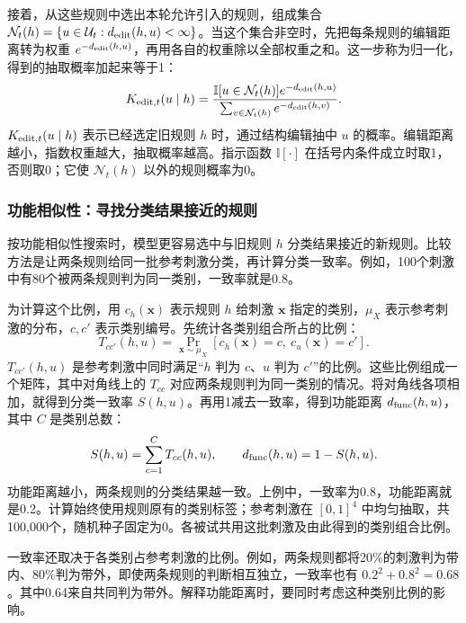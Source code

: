 \documentclass[12pt]{article}
\newcommand{\ind}{\mathbb I}
\begin{document}
接着，从这些规则中选出本轮允许引入的规则，组成集合 $\mathcal N_t(h)=\{u\in\mathcal U_t:d_{\rm edit}(h,u)<\infty\}$。当这个集合非空时，先把每条规则的编辑距离转为权重 $e^{-d_{\rm edit}(h,u)}$，再用各自的权重除以全部权重之和。这一步称为归一化，得到的抽取概率加起来等于1：
\begin{equation}
K_{{\rm edit},t}(u\mid h)=
\frac{\ind[u\in\mathcal N_t(h)]e^{-d_{\rm edit}(h,u)}}
{\sum_{v\in\mathcal N_t(h)}e^{-d_{\rm edit}(h,v)}}.
\label{eq:edit-proposal}
\end{equation}
$K_{{\rm edit},t}(u\mid h)$ 表示已经选定旧规则 $h$ 时，通过结构编辑抽中 $u$ 的概率。编辑距离越小，指数权重越大，抽取概率越高。指示函数 $\ind[\cdot]$ 在括号内条件成立时取1，否则取0；它使 $\mathcal N_t(h)$ 以外的规则概率为0。

\subsubsection{功能相似性：寻找分类结果接近的规则}

按功能相似性搜索时，模型更容易选中与旧规则 $h$ 分类结果接近的新规则。比较方法是让两条规则给同一批参考刺激分类，再计算分类一致率。例如，100个刺激中有80个被两条规则判为同一类别，一致率就是0.8。

为计算这个比例，用 $c_h(\bm x)$ 表示规则 $h$ 给刺激 $\bm x$ 指定的类别，$\mu_X$ 表示参考刺激的分布，$c,c'$ 表示类别编号。先统计各类别组合所占的比例：
\begin{equation}
T_{cc'}(h,u)=\Pr_{\bm x\sim\mu_X}[c_h(\bm x)=c,\ c_u(\bm x)=c'].
\end{equation}
$T_{cc'}(h,u)$ 是参考刺激中同时满足“$h$ 判为 $c$、$u$ 判为 $c'$”的比例。这些比例组成一个矩阵，其中对角线上的 $T_{cc}$ 对应两条规则判为同一类别的情况。将对角线各项相加，就得到分类一致率 $S(h,u)$。再用1减去一致率，得到功能距离 $d_{\rm func}(h,u)$，其中 $C$ 是类别总数：
\begin{equation}
S(h,u)=\sum_{c=1}^{C}T_{cc}(h,u),\qquad
d_{\rm func}(h,u)=1-S(h,u).
\label{eq:functional-distance}
\end{equation}
功能距离越小，两条规则的分类结果越一致。上例中，一致率为0.8，功能距离就是0.2。计算始终使用规则原有的类别标签；参考刺激在 $[0,1]^4$ 中均匀抽取，共100,000个，随机种子固定为0。各被试共用这批刺激及由此得到的类别组合比例。

一致率还取决于各类别占参考刺激的比例。例如，两条规则都将20\%的刺激判为带内、80\%判为带外，即使两条规则的判断相互独立，一致率也有 $0.2^2+0.8^2=0.68$。其中0.64来自共同判为带外。解释功能距离时，要同时考虑这种类别比例的影响。
\end{document}
